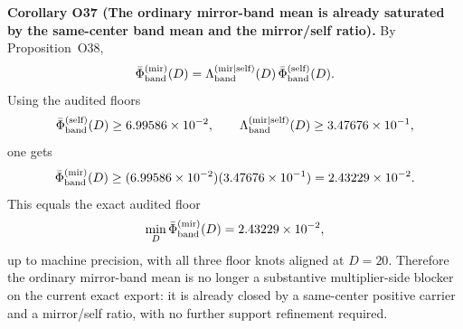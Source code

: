 \documentclass[aps,prd,onecolumn,notitlepage,nofootinbib,superscriptaddress,11pt,floatfix]{revtex4-2}
\begin{document}
\medskip\noindent\textbf{Corollary O37 (The ordinary mirror-band mean is already saturated by the same-center band mean and the mirror/self ratio).}
By Proposition~O38,
\[
\bar\Phi_{\rm band}^{\rm(mir)}(D)
=
\Lambda_{\rm band}^{\rm(mir|self)}(D)\,\bar\Phi_{\rm band}^{\rm(self)}(D).
\]
Using the audited floors
\[
\bar\Phi_{\rm band}^{\rm(self)}(D)\ge 6.99586\times10^{-2},
\qquad
\Lambda_{\rm band}^{\rm(mir|self)}(D)\ge 3.47676\times10^{-1},
\]
one gets
\[
\bar\Phi_{\rm band}^{\rm(mir)}(D)
\ge
(6.99586\times10^{-2})(3.47676\times10^{-1})
=
2.43229\times10^{-2}.
\]
This equals the exact audited floor
\[
\min_D \bar\Phi_{\rm band}^{\rm(mir)}(D)
=
2.43229\times10^{-2},
\]
up to machine precision, with all three floor knots aligned at \(D=20\). Therefore the ordinary mirror-band mean is no longer a substantive multiplier-side blocker on the current exact export: it is already closed by a same-center positive carrier and a mirror/self ratio, with no further support refinement required.
\end{document}
